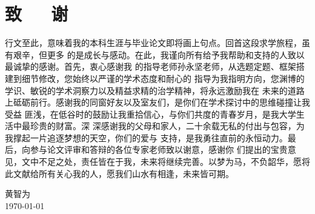\documentclass{article}
\numberwithin {equation}{section}
\begin{document}
\newpage
\section*{致\ \ \ 谢}

  行文至此，意味着我的本科生涯与毕业论文即将画上句点。回首这段求学旅程，虽有艰辛，但更多
  的是成长与感动。在此，我谨向所有给予我帮助和支持的人致以最诚挚的感谢。首先，衷心感谢我
  的指导老师孙永坚老师，从选题定题、框架搭建到细节修改，您始终以严谨的学术态度和耐心的
  指导为我指明方向，您渊博的学识、敏锐的学术洞察力以及精益求精的治学精神，将永远激励我在
  未来的道路上砥砺前行。感谢我的同窗好友以及室友们，是你们在学术探讨中的思维碰撞让我受益
  匪浅，在低谷时的鼓励让我重拾信心，与你们共度的青春岁月，是我大学生活中最珍贵的财富。深
  深感谢我的父母和家人，二十余载无私的付出与包容，为我撑起一片追逐梦想的天空，你们的爱与
  支持，是我勇往直前的永恒动力。最后，向参与论文评审和答辩的各位专家老师致以谢意，感谢你
  们提出的宝贵意见，文中不足之处，责任皆在于我，未来将继续完善。以梦为马，不负韶华，愿将
  此文献给所有关心我的人，愿我们山水有相逢，未来皆可期。\vspace{1em} \\
  \begin{flushright}
    黄智为\\
    \today{}
  \end{flushright}
  
  
\end{document}

